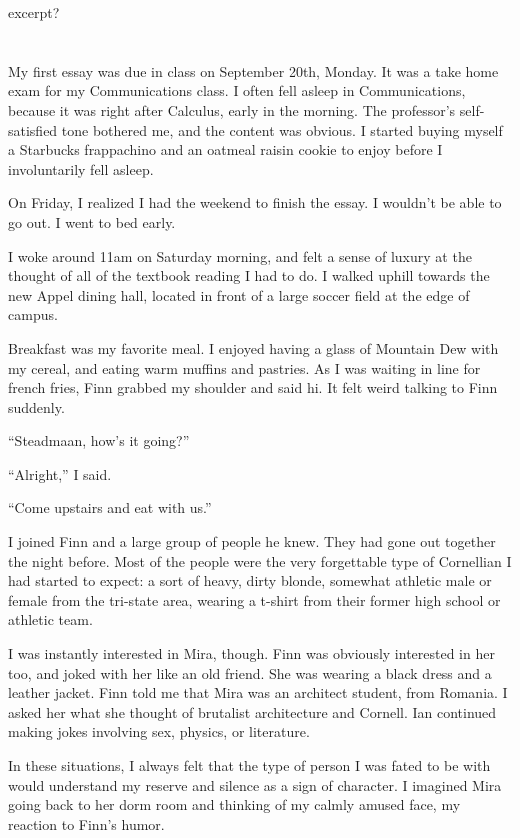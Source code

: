 excerpt?
\section{}

My first essay was due in class on September 20th, Monday.  It was a take home
exam for my Communications class.  I often fell asleep in Communications,
because it was right after Calculus, early in the morning.  The professor's
self-satisfied tone bothered me, and the content was obvious.  I started buying
myself a Starbucks frappachino and an oatmeal raisin cookie to enjoy before I
involuntarily fell asleep.

On Friday, I realized I had the weekend to finish the essay.  I wouldn't be able
to go out. I went to bed early.

I woke around 11am on Saturday morning, and felt a sense of luxury at the
thought of all of the textbook reading I had to do.  I walked uphill towards the
new Appel dining hall, located in front of a large soccer field at the edge of
campus.

Breakfast was my favorite meal.  I enjoyed having a glass of Mountain Dew with
my cereal, and eating warm muffins and pastries.  As I was waiting in line for
french fries, Finn grabbed my shoulder and said hi.  It felt weird talking to
Finn suddenly.

``Steadmaan, how's it going?''

``Alright,'' I said.

``Come upstairs and eat with us.'' 

I joined Finn and a large group of people he knew.  They had gone out together
the night before.  Most of the people were the very forgettable type of
Cornellian I had started to expect: a sort of heavy, dirty blonde, somewhat
athletic male or female from the tri-state area, wearing a t-shirt from their
former high school or athletic team.

I was instantly interested in Mira, though.  Finn was obviously interested in
her too, and joked with her like an old friend.  She was wearing a black dress
and a leather jacket.  Finn told me that Mira was an architect student, from
Romania.  I asked her what she thought of brutalist architecture and Cornell.
Ian continued making jokes involving sex, physics, or literature. 

In these situations, I always felt that the type of person I was fated to be
with would understand my reserve and silence as a sign of character.  I imagined
Mira going back to her dorm room and thinking of my calmly amused face, my
reaction to Finn's humor.  

